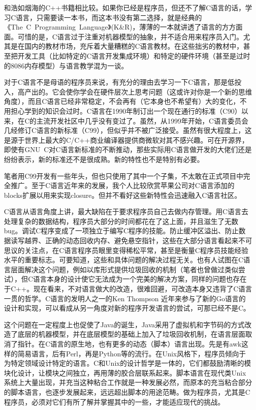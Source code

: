 和浩如烟海的C++书籍相比较。如果你已经是程序员，但还不了解C语言的话，学习C语言，只需要读一本书，而这本书没有第二选择，就是经典的《The\  C\  Programming\  Language》(K\&R)，薄薄的一本就讲透了语言的方方面面。可惜的是，C语言过于注重对机器模型的抽象，并不适合用来程序员入门。尤其是在国内的教材市场，充斥着大量糟糕的C语言教材。在这些拙劣的教材中，甚至把开发工具（比如特定的C语言开发集成环境）和特定的硬件环境（甚至是过时的$8086$内存模型）与语言教学混为一谈。

对于C语言不是母语的程序员来说，有充分的理由去学习一下C语言，那是低投入，高产出的。它会使你学会在硬件层次上思考问题（这或许对你是一个新的思维角度），而且C语言已经非常稳定，不会再有（它本身也不希望有）大的变化，不用担心学到的知识会过时。C语言在1990年制订出一个现在通行的标准（C90）以来，在C的主流开发社区中几乎没有变过了。虽然，从1999年开始，C语言委员会几经修订C语言的新标准（C99），但似乎并不被广泛接受。虽然有很大程度上，这是源于世界上最大的C/C++商业编译器提供商微软对其不感兴趣。可在开源界，即使有GNU\  C对C语言新标准的不断推动，那些实际用C语言做开发的大佬们还是纷纷表示，新的标准还不是很成熟。新的特性也不是特别有必要。

笔者用C99开发有一些年头，但也只使用了其中一个子集，不太敢在正式项目中完全推广。至于C语言近年来的发展，我个人比较欣赏苹果公司对C语言添加的blocks扩展以用来实现closure。但并不看好这些新特性会迅速融入C语言社区。

C语言从语言角度上讲，最大缺陷在于要求程序员自己去做内存管理。用C语言去处理复杂的数据结构，程序员大部分的时间都花在了这上面，并且滋生了无数bug。调试C程序变成了一项独立于编写C程序的技能。防止缓冲区溢出、防止数据读写越界、正确的动态回收内存、避免悬空指针，这些在大部分语言看起来不可思议的关注点，在C语言程序员眼里变得稀松平常，甚至是衡量C程序员技能经验水平的重要标志。可要知道，这些和具体问题的解决过程无关。也有人试图在C语言层面解决这个问题，例如以库形式提供垃圾回收的机制（笔者也曾做过类似尝试），但C语言本身的设计使它无法成为一个完美的解决方案，同样的问题也存在于C++。现在看来，不对语言做大的改造，很难回避，可改造本身又违背了C语言一贯的哲学。C语言的发明人之一的Ken Thompson 近年来参与了新的Go语言的设计和实现，可以看成从另一角度对新的程序开发语言的尝试，可那已经不是C。

这个问题在一定程度上也促使了Java的诞生，Java采用了虚拟机和字节码的方式改造了底层的机器模型，并在底层模型的基础上加入了垃圾回收机制，在语言层面取消了指针。在C语言的原生地，也有更多的动态（脚本）语言出现。先是有awk这样的简易语言，后有Perl，再是Python等的流行。在Unix风格下，程序员倾向于为特定领域设计特定的语言。C和Unix的设计哲学是一体的，它们都鼓励清晰的模块化设计，让模块之间独立，再用薄的胶合层联系起来。脚本语言在现代类Unix系统上大量出现，并充当这种粘合工作就是一种发展必然，而原本的充当粘合部分的脚本语言，也逐步发展起来，远远超出脚本的用途范畴。做为程序员，尤其是C程序员，必须对它们有所了解并掌握其中的一些，才能适应现代的挑战。

